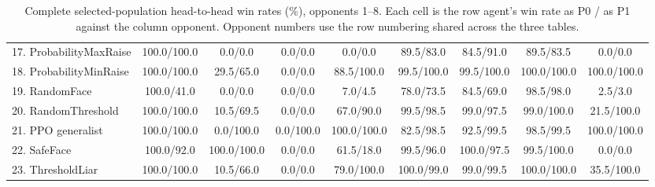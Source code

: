 \begin{table}[!ht]
{\begin{tabular}{lcccccccc}
17. ProbabilityMaxRaise & 100.0/100.0 & 0.0/0.0 & 0.0/0.0 & 0.0/0.0 & 89.5/83.0 & 84.5/91.0 & 89.5/83.5 & 0.0/0.0 \\
18. ProbabilityMinRaise & 100.0/100.0 & 29.5/65.0 & 0.0/0.0 & 88.5/100.0 & 99.5/100.0 & 99.5/100.0 & 100.0/100.0 & 100.0/100.0 \\
19. RandomFace & 100.0/41.0 & 0.0/0.0 & 0.0/0.0 & 7.0/4.5 & 78.0/73.5 & 84.5/69.0 & 98.5/98.0 & 2.5/3.0 \\
20. RandomThreshold & 100.0/100.0 & 10.5/69.5 & 0.0/0.0 & 67.0/90.0 & 99.5/98.5 & 99.0/97.5 & 99.0/100.0 & 21.5/100.0 \\
21. PPO generalist & 100.0/100.0 & 0.0/100.0 & 0.0/100.0 & 100.0/100.0 & 82.5/98.5 & 92.5/99.5 & 98.5/99.5 & 100.0/100.0 \\
22. SafeFace & 100.0/92.0 & 100.0/100.0 & 0.0/0.0 & 61.5/18.0 & 99.5/96.0 & 100.0/97.5 & 99.5/100.0 & 0.0/0.0 \\
23. ThresholdLiar & 100.0/100.0 & 10.5/66.0 & 0.0/0.0 & 79.0/100.0 & 100.0/99.0 & 99.0/99.5 & 100.0/100.0 & 35.5/100.0 \\
\bottomrule
\end{tabular}}
\caption{Complete selected-population head-to-head win rates (\%), opponents 1--8. Each cell is the row agent's win rate as P0 / as P1 against the column opponent. Opponent numbers use the row numbering shared across the three tables.}
\end{table}
\clearpage

